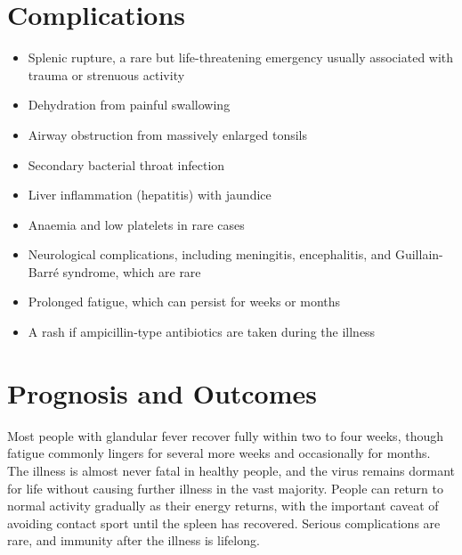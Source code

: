 \section*{Complications}
\begin{itemize}
    \item Splenic rupture, a rare but life-threatening emergency usually associated with trauma or strenuous activity
    \item Dehydration from painful swallowing
    \item Airway obstruction from massively enlarged tonsils
    \item Secondary bacterial throat infection
    \item Liver inflammation (hepatitis) with jaundice
    \item Anaemia and low platelets in rare cases
    \item Neurological complications, including meningitis, encephalitis, and Guillain-Barré syndrome, which are rare
    \item Prolonged fatigue, which can persist for weeks or months
    \item A rash if ampicillin-type antibiotics are taken during the illness
\end{itemize}

\section*{Prognosis and Outcomes}
Most people with glandular fever recover fully within two to four weeks, though fatigue commonly lingers for several more weeks and occasionally for months. The illness is almost never fatal in healthy people, and the virus remains dormant for life without causing further illness in the vast majority. People can return to normal activity gradually as their energy returns, with the important caveat of avoiding contact sport until the spleen has recovered. Serious complications are rare, and immunity after the illness is lifelong.

